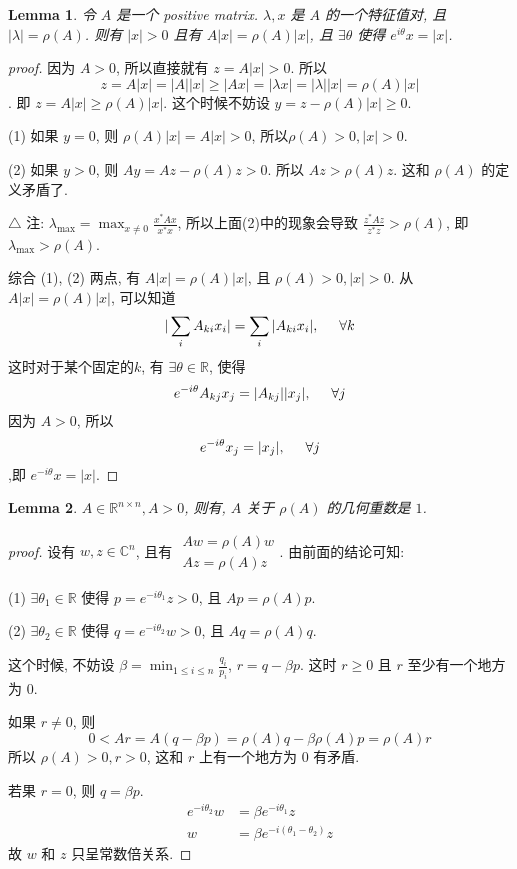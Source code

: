 \documentclass{article}
\newtheorem{lemma}{Lemma}
\begin{document}
\begin{lemma}
  令 $A$ 是一个 positive matrix.
  $\lambda, x$ 是 $A$ 的一个特征值对, 且 $|\lambda| = \rho(A)$.
  则有 $|x| > 0$ 且有 $A|x| = \rho(A)|x|$, 且 $\exists \theta$ 使得 $e^{i\theta}x = |x|$.
\end{lemma}
\begin{proof}[proof]
  因为 $A > 0$, 所以直接就有 $z = A|x| > 0$.
  所以 \[z = A|x| = |A||x| \geq |Ax| = |\lambda x| = |\lambda| |x| = \rho(A)|x|\].
  即 $z = A|x| \geq \rho(A)|x|$. 这个时候不妨设 $y = z - \rho(A)|x| \geq 0$.

  (1) 如果 $y = 0$, 则 $\rho(A)|x| = A|x| > 0$, 所以$\rho(A) > 0, |x| > 0$.

  (2) 如果 $y > 0$, 则 $Ay = Az - \rho(A)z > 0$.
  所以 $Az > \rho(A)z$. 这和 $\rho(A)$ 的定义矛盾了.

  $\triangle$ 注: $\lambda_{\max} = \max_{x\not=0} \frac{x^*Ax}{x^*x}$,
  所以上面(2)中的现象会导致 $\frac{z^*Az}{z^*z} > \rho(A)$, 即 $\lambda_{\max} > \rho(A)$.
  
  \vspace{0.3cm}
  综合  (1), (2) 两点, 有 $A|x| = \rho(A)|x|$, 且 $\rho(A) > 0, |x| > 0$.
  从 $A|x| = \rho(A)|x|$, 可以知道
  \[|\sum_i A_{ki}x_i| = \sum_i |A_{ki}x_i|, \hspace{0.5cm} \forall k\]
  这时对于某个固定的$k$, 有 $\exists \theta\in\mathbb{R}$, 使得
  \[e^{-i\theta} A_{kj}x_j = |A_{kj}||x_j|, \hspace{0.5cm} \forall j\]
  因为 $A > 0$, 所以
  \[e^{-i\theta} x_j = |x_j|, \hspace{0.5cm} \forall j\]
  ,即 $e^{-i\theta} x = |x|$.
\end{proof}

\begin{lemma}
  $A \in \mathbb{R}^{n\times n}, A > 0$, 则有, $A$ 关于 $\rho(A)$ 的几何重数是 $1$.
\end{lemma}
\begin{proof}[proof]
  设有 $w, z\in\mathbb{C}^n$, 且有 $\substack{Aw = \rho(A)w\\ Az = \rho(A)z}$.
  由前面的结论可知:

  (1) $\exists \theta_1\in\mathbb{R}$ 使得 $p = e^{-i\theta_1}z > 0$, 且 $Ap = \rho(A)p$.

  (2) $\exists \theta_2\in\mathbb{R}$ 使得 $q = e^{-i\theta_2}w > 0$, 且 $Aq = \rho(A)q$.

  这个时候, 不妨设 $\beta = \min_{1\leq i\leq n} \frac{q_i}{p_i}$, $r = q - \beta p$.
  这时 $r \geq 0$ 且 $r$ 至少有一个地方为 $0$.

  如果 $r\not = 0$, 则
  \[ 0 < Ar = A(q - \beta p) = \rho(A)q - \beta\rho(A)p = \rho(A)r\]
  所以 $\rho(A) > 0, r > 0$, 这和 $r$ 上有一个地方为 $0$ 有矛盾.

  若果  $r = 0$, 则 $q = \beta p$.
  \begin{align*}
    e^{-i\theta_2}w &= \beta e^{-i\theta_1}z \\
    w &= \beta e^{-i(\theta_1 - \theta_2)}z
  \end{align*}
  故 $w$ 和 $z$ 只呈常数倍关系.
\end{proof}
\end{document}
